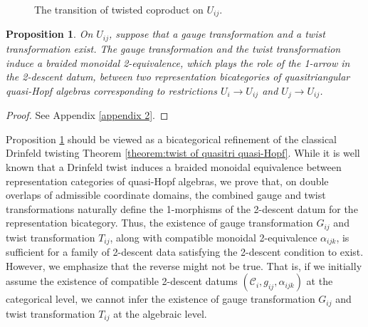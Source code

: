 \documentclass[reqno]{amsart}
\newtheorem{proposition}[formula]{Proposition}
\theoremstyle{definition}
\theoremstyle{remark}
\begin{document}
\begin{figure}[H]
\begin{minipage}{0.50\textwidth}
\captionsetup{
    width=5cm,
    singlelinecheck=false
}
\caption{The transition of twisted coproduct on $U_{ij}$.}\label{fig:transition of twisted coproduct}
\end{minipage}
\end{figure}



\begin{proposition}\label{prop:gauge transformation}
    On $U_{ij}$, suppose that a gauge transformation and a twist transformation exist. The gauge transformation and the twist transformation induce a braided monoidal 2-equivalence, which plays the role of the 1-arrow in the 2-descent datum, between two representation bicategories of quasitriangular quasi-Hopf algebras corresponding to restrictions $U_i \longrightarrow U_{ij}$ and $U_j \longrightarrow U_{ij}$.
\end{proposition}
\begin{proof}
    See Appendix \ref{appendix 2}.
\end{proof}

Proposition \ref{prop:gauge transformation} should be viewed as a bicategorical refinement of the classical Drinfeld twisting Theorem \ref{theorem:twist of quasitri quasi-Hopf}. While it is well known that a Drinfeld twist induces a braided monoidal equivalence between representation categories of quasi-Hopf algebras, we prove that, on double overlaps of admissible coordinate domains, 
the combined gauge and twist transformations naturally define the 1-morphisms of the 2-descent datum for the representation bicategory. Thus, the existence of gauge transformation $G_{ij}$ and twist transformation $T_{ij}$, along with compatible monoidal 2-equivalence $\alpha_{ijk}$, is sufficient for a family of 2-descent data satisfying the 2-descent condition to exist. However, we emphasize that the reverse might not be true. That is, if we initially assume the existence of compatible 2-descent datums $\left(\mathcal{C}_i,g_{ij},\alpha_{ijk}\right)$ at the categorical level, we cannot infer the existence of gauge transformation $G_{ij}$ and twist transformation $T_{ij}$ at the algebraic level.
\end{document}
